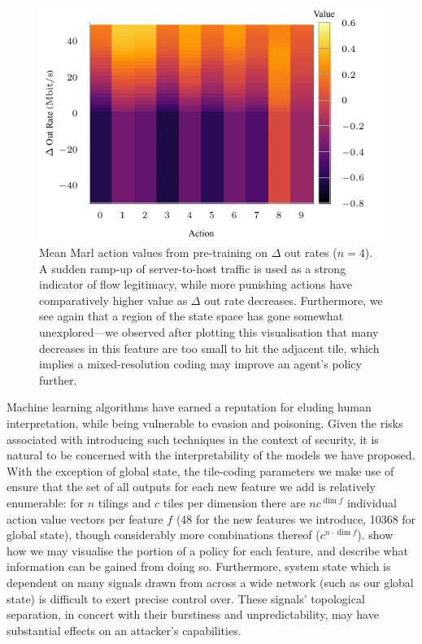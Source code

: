 \documentclass[conference, a4paper, 10pt, times]{IEEEtran}
\begin{document}
\begin{figure}
	\centering
	\includegraphics[width=0.9\linewidth]{../plots/policy-4-tcp-f7-mean}
	
	\caption{
		Mean Marl action values from pre-training on $\Delta$ out rates ($n=4$).
		A sudden ramp-up of server-to-host traffic is used as a strong indicator of flow legitimacy, while more punishing actions have comparatively higher value as $\Delta$ out rate decreases.
		Furthermore, we see again that a region of the state space has gone somewhat unexplored---we observed after plotting this visualisation that many decreases in this feature are too small to hit the adjacent tile, which implies a mixed-resolution coding may improve an agent's policy further.
		\label{fig:intern-16-tcp-something}
	}
\end{figure}

Machine learning algorithms have earned a reputation for eluding human interpretation, while being vulnerable to evasion and poisoning.
Given the risks associated with introducing such techniques in the context of security, it is natural to be concerned with the interpretability of the models we have proposed.
With the exception of global state, the tile-coding parameters we make use of ensure that the set of all outputs for each new feature we add is relatively enumerable: for $n$ tilings and $c$ tiles per dimension there are $nc^{\dim{f}}$ individual action value vectors per feature $f$ (\num{48} for the new features we introduce, \num{10368} for global state), though considerably more combinations thereof ($c^{n \cdot \dim{f}}$).
 show how we may visualise the portion of a policy for each feature, and describe what information can be gained from doing so.
Furthermore, system state which is dependent on many signals drawn from across a wide network (such as our global state) is difficult to exert precise control over.
These signals' topological separation, in concert with their burstiness and unpredictability, may have substantial effects on an attacker's capabilities.
\end{document}

